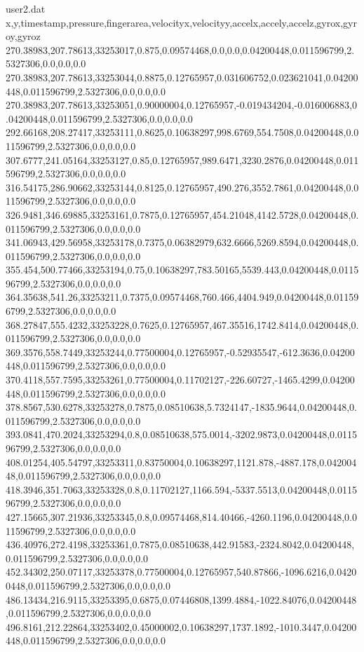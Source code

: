 \begin{filecontents}{user2.dat}
x,y,timestamp,pressure,fingerarea,velocityx,velocityy,accelx,accely,accelz,gyrox,gyroy,gyroz
270.38983,207.78613,33253017,0.875,0.09574468,0.0,0.0,0.04200448,0.011596799,2.5327306,0.0,0.0,0.0
270.38983,207.78613,33253044,0.8875,0.12765957,0.031606752,0.023621041,0.04200448,0.011596799,2.5327306,0.0,0.0,0.0
270.38983,207.78613,33253051,0.90000004,0.12765957,-0.019434204,-0.016006883,0.04200448,0.011596799,2.5327306,0.0,0.0,0.0
292.66168,208.27417,33253111,0.8625,0.10638297,998.6769,554.7508,0.04200448,0.011596799,2.5327306,0.0,0.0,0.0
307.6777,241.05164,33253127,0.85,0.12765957,989.6471,3230.2876,0.04200448,0.011596799,2.5327306,0.0,0.0,0.0
316.54175,286.90662,33253144,0.8125,0.12765957,490.276,3552.7861,0.04200448,0.011596799,2.5327306,0.0,0.0,0.0
326.9481,346.69885,33253161,0.7875,0.12765957,454.21048,4142.5728,0.04200448,0.011596799,2.5327306,0.0,0.0,0.0
341.06943,429.56958,33253178,0.7375,0.06382979,632.6666,5269.8594,0.04200448,0.011596799,2.5327306,0.0,0.0,0.0
355.454,500.77466,33253194,0.75,0.10638297,783.50165,5539.443,0.04200448,0.011596799,2.5327306,0.0,0.0,0.0
364.35638,541.26,33253211,0.7375,0.09574468,760.466,4404.949,0.04200448,0.011596799,2.5327306,0.0,0.0,0.0
368.27847,555.4232,33253228,0.7625,0.12765957,467.35516,1742.8414,0.04200448,0.011596799,2.5327306,0.0,0.0,0.0
369.3576,558.7449,33253244,0.77500004,0.12765957,-0.52935547,-612.3636,0.04200448,0.011596799,2.5327306,0.0,0.0,0.0
370.4118,557.7595,33253261,0.77500004,0.11702127,-226.60727,-1465.4299,0.04200448,0.011596799,2.5327306,0.0,0.0,0.0
378.8567,530.6278,33253278,0.7875,0.08510638,5.7324147,-1835.9644,0.04200448,0.011596799,2.5327306,0.0,0.0,0.0
393.0841,470.2024,33253294,0.8,0.08510638,575.0014,-3202.9873,0.04200448,0.011596799,2.5327306,0.0,0.0,0.0
408.01254,405.54797,33253311,0.83750004,0.10638297,1121.878,-4887.178,0.04200448,0.011596799,2.5327306,0.0,0.0,0.0
418.3946,351.7063,33253328,0.8,0.11702127,1166.594,-5337.5513,0.04200448,0.011596799,2.5327306,0.0,0.0,0.0
427.15665,307.21936,33253345,0.8,0.09574468,814.40466,-4260.1196,0.04200448,0.011596799,2.5327306,0.0,0.0,0.0
436.40976,272.4198,33253361,0.7875,0.08510638,442.91583,-2324.8042,0.04200448,0.011596799,2.5327306,0.0,0.0,0.0
452.34302,250.07117,33253378,0.77500004,0.12765957,540.87866,-1096.6216,0.04200448,0.011596799,2.5327306,0.0,0.0,0.0
486.13434,216.9115,33253395,0.6875,0.07446808,1399.4884,-1022.84076,0.04200448,0.011596799,2.5327306,0.0,0.0,0.0
496.8161,212.22864,33253402,0.45000002,0.10638297,1737.1892,-1010.3447,0.04200448,0.011596799,2.5327306,0.0,0.0,0.0

\end{filecontents}
